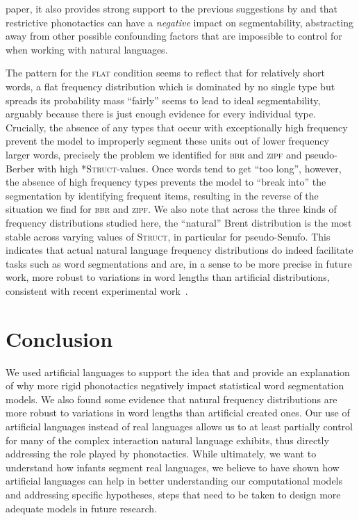 \documentclass[11pt]{article}
\begin{document}
paper, it also provides strong support to the previous suggestions by \cite{Daland13a} and \cite{Fourtassi13a} that restrictive phonotactics can have a \emph{negative} impact on segmentability, abstracting away from other possible confounding factors that are impossible to control for when working with natural languages.

The pattern for the \textsc{flat} condition seems to reflect that for relatively short words, a flat frequency distribution which is dominated by no single type but spreads its probability mass ``fairly'' seems to lead to ideal segmentability, arguably because there is just enough evidence for every individual type. Crucially, the absence of any types that occur with exceptionally high frequency prevent the model to improperly segment these units out of lower frequency larger words, precisely the problem we identified for \textsc{bbr} and \textsc{zipf} and pseudo-Berber with high \textsc{*Struct}-values. Once words tend to get ``too long'', however, the absence of high frequency types prevents the model to ``break into'' the segmentation by identifying frequent items, resulting in the reverse of the situation we find for \textsc{bbr} and \textsc{zipf}. We also note that across the three kinds of frequency distributions studied here, the ``natural'' Brent distribution is the most stable across varying values of \textsc{Struct}, in particular for pseudo-Senufo. This indicates that actual natural language frequency distributions do indeed facilitate tasks such as word segmentations and are, in a sense to be more precise in future work, more robust to variations in word lengths than artificial distributions, consistent with recent experimental work~\cite{Kurumada13a}.

\section{Conclusion}
\vspace*{-5pt}
We used artificial languages to support the idea that and provide an explanation of why more rigid phonotactics negatively impact statistical word segmentation models. We also found some evidence that natural frequency distributions are more robust to variations in word lengths than artificial created ones. Our use of artificial languages instead of real languages allows us to at least partially control for many of the complex interaction natural language exhibits, thus directly addressing the role played by phonotactics. While ultimately, we want to understand how infants segment real languages, we believe to have shown how artificial languages can help in better understanding our computational models and addressing specific hypotheses, steps that need to be taken to design more adequate models in future research.


\end{document}
